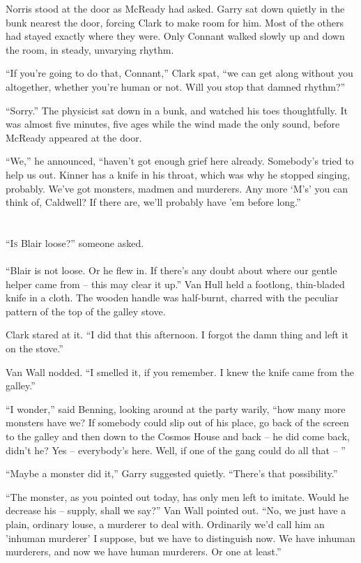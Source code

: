 \documentclass[ebook,oneside,11pt]{memoir}				%
\begin{document}
Norris stood at the door as McReady had asked. Garry sat down quietly in the bunk nearest the door, forcing Clark to make room for him. Most of the others had stayed exactly where they were. Only Connant walked slowly up and down the room, in steady, unvarying rhythm.

``If you're going to do that, Connant,'' Clark spat, ``we can get along without you altogether, whether you're human or not. Will you stop that damned rhythm?''

``Sorry.'' The physicist sat down in a bunk, and watched his toes thoughtfully. It was almost five minutes, five ages while the wind made the only sound, before McReady appeared at the door.

``We,'' he announced, ``haven't got enough grief here already. Somebody's tried to help us out. Kinner has a knife in his throat, which was why he stopped singing, probably. We've got monsters, madmen and murderers. Any more `M's' you can think of, Caldwell? If there are, we'll probably have 'em before long.'' 

\chapter[Chapter 11]{}
\lettrine[lines=3,findent=3pt,nindent=2pt]{``I}{s} Blair loose?'' someone asked.\\\\

``Blair is not loose. Or he flew in. If there's any doubt about where our gentle helper came from -- this may clear it up.'' Van Hull held a footlong, thin-bladed knife in a cloth. The wooden handle was half-burnt, charred with the peculiar pattern of the top of the galley stove.

Clark stared at it. ``I did that this afternoon. I forgot the damn thing and left it on the stove.''

Van Wall nodded. ``I smelled it, if you remember. I knew the knife came from the galley.''

``I wonder,'' said Benning, looking around at the party warily, ``how many more monsters have we? If somebody could slip out of his place, go back of the screen to the galley and then down to the Cosmos House and back -- he did come back, didn't he? Yes -- everybody's here. Well, if one of the gang could do all that -- ''

``Maybe a monster did it,'' Garry suggested quietly. ``There's that possibility.''

``The monster, as you pointed out today, has only men left to imitate. Would he decrease his -- supply, shall we say?'' Van Wall pointed out. ``No, we just have a plain, ordinary louse, a murderer to deal with. Ordinarily we'd call him an 'inhuman murderer' I suppose, but we have to distinguish now. We have inhuman murderers, and now we have human murderers. Or one at least.''
\end{document}
